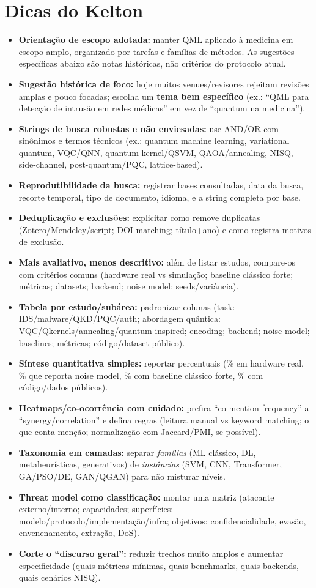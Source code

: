 \documentclass[11pt]{article}
\begin{document}
\section{Dicas do Kelton}
\begin{itemize}
  \item \textbf{Orientação de escopo adotada:} manter QML aplicado à medicina em escopo amplo, organizado por tarefas e famílias de métodos. As sugestões específicas abaixo são notas históricas, não critérios do protocolo atual.
  \item \textbf{Sugestão histórica de foco:} hoje muitos venues/revisores rejeitam revisões amplas e pouco focadas; escolha um \textbf{tema bem específico} (ex.: ``QML para detecção de intrusão em redes médicas'' em vez de ``quantum na medicina'').
  \item \textbf{Strings de busca robustas e não enviesadas:} use AND/OR com sinônimos e termos técnicos (ex.: quantum machine learning, variational quantum, VQC/QNN, quantum kernel/QSVM, QAOA/annealing, NISQ, side-channel, post-quantum/PQC, lattice-based).
  \item \textbf{Reprodutibilidade da busca:} registrar bases consultadas, data da busca, recorte temporal, tipo de documento, idioma, e a string completa por base.
  \item \textbf{Deduplicação e exclusões:} explicitar como remove duplicatas (Zotero/Mendeley/script; DOI matching; título+ano) e como registra motivos de exclusão.
  \item \textbf{Mais avaliativo, menos descritivo:} além de listar estudos, compare-os com critérios comuns (hardware real vs simulação; baseline clássico forte; métricas; datasets; backend; noise model; seeds/variância).
  \item \textbf{Tabela por estudo/subárea:} padronizar colunas (task: IDS/malware/QKD/PQC/auth; abordagem quântica: VQC/Qkernels/annealing/quantum-inspired; encoding; backend; noise model; baselines; métricas; código/dataset público).
  \item \textbf{Síntese quantitativa simples:} reportar percentuais (\% em hardware real, \% que reporta noise model, \% com baseline clássico forte, \% com código/dados públicos).
  \item \textbf{Heatmaps/co-ocorrência com cuidado:} prefira ``co-mention frequency'' a ``synergy/correlation'' e defina regras (leitura manual vs keyword matching; o que conta menção; normalização com Jaccard/PMI, se possível).
  \item \textbf{Taxonomia em camadas:} separar \emph{famílias} (ML clássico, DL, metaheurísticas, generativos) de \emph{instâncias} (SVM, CNN, Transformer, GA/PSO/DE, GAN/QGAN) para não misturar níveis.
  \item \textbf{Threat model como classificação:} montar uma matriz (atacante externo/interno; capacidades; superfícies: modelo/protocolo/implementação/infra; objetivos: confidencialidade, evasão, envenenamento, extração, DoS).
  \item \textbf{Corte o ``discurso geral'':} reduzir trechos muito amplos e aumentar especificidade (quais métricas mínimas, quais benchmarks, quais backends, quais cenários NISQ).
\end{itemize}
\end{document}
